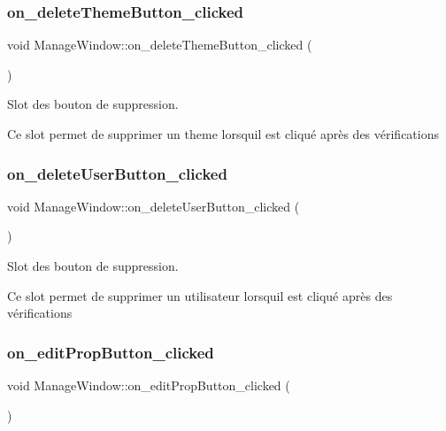 \subsubsection{\texorpdfstring{on\+\_\+delete\+Theme\+Button\+\_\+clicked}{on\_deleteThemeButton\_clicked}}
{\footnotesize\ttfamily void Manage\+Window\+::on\+\_\+delete\+Theme\+Button\+\_\+clicked (\begin{DoxyParamCaption}{ }\end{DoxyParamCaption})\hspace{0.3cm}{\ttfamily [slot]}}



Slot des bouton de suppression. 

Ce slot permet de supprimer un theme lorsqu\textquotesingle{}il est cliqué après des vérifications \mbox{\label{classManageWindow_a23bbad3a8c73d95e2f8f27df6458d2ea}} 
\subsubsection{\texorpdfstring{on\+\_\+delete\+User\+Button\+\_\+clicked}{on\_deleteUserButton\_clicked}}
{\footnotesize\ttfamily void Manage\+Window\+::on\+\_\+delete\+User\+Button\+\_\+clicked (\begin{DoxyParamCaption}{ }\end{DoxyParamCaption})\hspace{0.3cm}{\ttfamily [slot]}}



Slot des bouton de suppression. 

Ce slot permet de supprimer un utilisateur lorsqu\textquotesingle{}il est cliqué après des vérifications \mbox{\label{classManageWindow_a5ca2c828847bf13c40699128cc061171}} 
\subsubsection{\texorpdfstring{on\+\_\+edit\+Prop\+Button\+\_\+clicked}{on\_editPropButton\_clicked}}
{\footnotesize\ttfamily void Manage\+Window\+::on\+\_\+edit\+Prop\+Button\+\_\+clicked (\begin{DoxyParamCaption}{ }\end{DoxyParamCaption})\hspace{0.3cm}{\ttfamily [slot]}}




